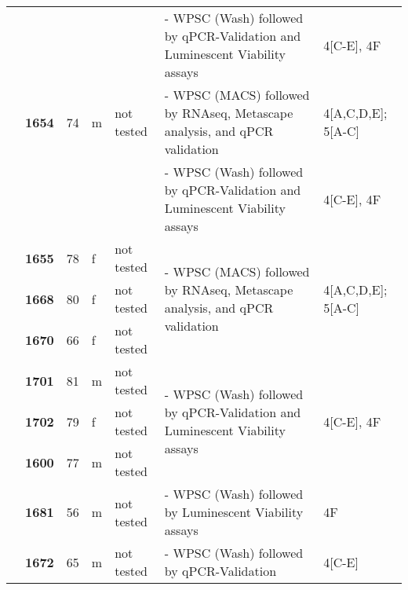 {\begin{longtable}{|>{\bfseries}p{1.5cm}|>{\bfseries}p{1.2cm}|p{1cm}|p{1cm}|p{2.3cm}|p{6cm}|p{1.7cm}|}
    \hhline{~~~~~--}
                      &       &    &   &            & - WPSC (Wash) followed by qPCR-Validation and Luminescent Viability assays                               & 4[C-E], 4F                              \\
    \hhline{~------}
                      & 1654  & 74 & m & not tested & - WPSC (MACS) followed by RNAseq, Metascape analysis, and qPCR validation                                & 4[A,C,D,E]; 5[A-C]                      \\
    \hhline{~~~~~--}
                      &       &    &   &            & - WPSC (Wash) followed by qPCR-Validation and Luminescent Viability assays                               & 4[C-E], 4F                              \\
    \hhline{~------}
                      & 1655  & 78 & f & not tested & \multirow{3}{6cm}{- WPSC (MACS) followed by RNAseq, Metascape analysis, and qPCR validation}             & \multirow{3}{1.7cm}{4[A,C,D,E]; 5[A-C]} \\
    \hhline{~----~~}
                      & 1668  & 80 & f & not tested &                                                                                                          &                                         \\
    \hhline{~----~~}
                      & 1670  & 66 & f & not tested &                                                                                                          &                                         \\
    \hhline{~------}
                      & 1701  & 81 & m & not tested & \multirow{3}{6cm}{- WPSC (Wash) followed by qPCR-Validation and Luminescent Viability assays}            & \multirow{3}{1.7cm}{4[C-E], 4F}         \\
    \hhline{~----~~}
                      & 1702  & 79 & f & not tested &                                                                                                          &                                         \\
    \hhline{~----~~}
                      & 1600  & 77 & m & not tested &                                                                                                          &                                         \\
    \hhline{~------}

                      & 1681  & 56 & m & not tested & - WPSC (Wash) followed by Luminescent Viability assays                                                   & 4F                                      \\
    \hhline{~------}
                      & 1672  & 65 & m & not tested & - WPSC (Wash) followed by qPCR-Validation                                                                & 4[C-E]                                  \\
\end{longtable}
}

